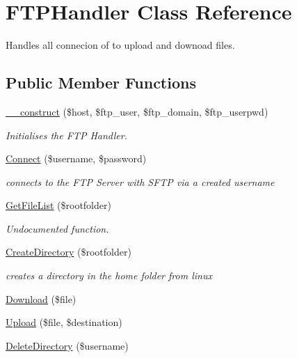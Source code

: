 \hypertarget{class_f_t_p_handler}{}\section{F\+T\+P\+Handler Class Reference}
\label{class_f_t_p_handler}


Handles all connecion of to upload and downoad files.  


\subsection*{Public Member Functions}
\begin{DoxyCompactItemize}
\item 
\hyperlink{class_f_t_p_handler_ae301a41ddeb9078684c83c4dc15bb773}{\+\_\+\+\_\+construct} (\$host, \$ftp\+\_\+user, \$ftp\+\_\+domain, \$ftp\+\_\+userpwd)
\begin{DoxyCompactList}\small\item\em Initialises the F\+TP Handler. \end{DoxyCompactList}\item 
\hyperlink{class_f_t_p_handler_a668e910f36a3b4f42c18576ac11a3cca}{Connect} (\$username, \$password)
\begin{DoxyCompactList}\small\item\em connects to the F\+TP Server with S\+F\+TP via a created username \end{DoxyCompactList}\item 
\hyperlink{class_f_t_p_handler_a6d3bfc8bc6b10bee4f850ac6ffb631dd}{Get\+File\+List} (\$rootfolder)
\begin{DoxyCompactList}\small\item\em Undocumented function. \end{DoxyCompactList}\item 
\hyperlink{class_f_t_p_handler_a3a8dfc5c7a497057832a9baf8fef8fee}{Create\+Directory} (\$rootfolder)
\begin{DoxyCompactList}\small\item\em creates a directory in the home folder from linux \end{DoxyCompactList}\item 
\hyperlink{class_f_t_p_handler_ac7580ca2ea33044a1be93305918cd97e}{Download} (\$file)
\item 
\hyperlink{class_f_t_p_handler_ae9c342082e22d788de7b94b34b2e40d1}{Upload} (\$file, \$destination)
\item 
\hyperlink{class_f_t_p_handler_ade28de62e449ec73546c4093fa4d6708}{Delete\+Directory} (\$username)
\end{DoxyCompactItemize}
